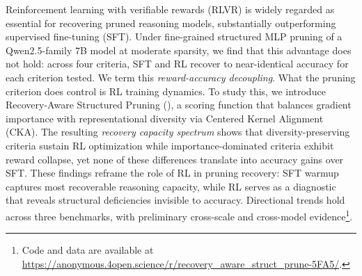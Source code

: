 Reinforcement learning with verifiable rewards (RLVR) is widely regarded as essential for recovering pruned reasoning models, substantially outperforming supervised fine-tuning (SFT). Under fine-grained structured MLP pruning of a Qwen2.5-family 7B model at moderate sparsity, we find that this advantage does not hold: across four criteria, SFT and RL recover to near-identical accuracy for each criterion tested. We term this \emph{reward-accuracy decoupling}.
What the pruning criterion does control is RL training dynamics. To study this, we introduce Recovery-Aware Structured Pruning (\rasp{}), a scoring function that balances gradient importance with representational diversity via Centered Kernel Alignment (CKA). The resulting \emph{recovery capacity spectrum} shows that diversity-preserving criteria sustain RL optimization while importance-dominated criteria exhibit reward collapse, yet none of these differences translate into accuracy gains over SFT.
These findings reframe the role of RL in pruning recovery: SFT warmup captures most recoverable reasoning capacity, while RL serves as a diagnostic that reveals structural deficiencies invisible to accuracy. Directional trends hold across three benchmarks, with preliminary cross-scale and cross-model evidence\footnote{Code and data are available at \url{https://anonymous.4open.science/r/recovery_aware_struct_prune-5FA5/}.}.
